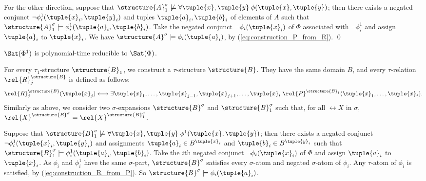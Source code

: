\documentclass{lmcs}
\begin{document}
For the other direction, suppose that $\structure{A}_1^\sigma\not\models\forall\tuple{x},\tuple{y}\;\phi(\tuple{x},\tuple{y})$; then there exists a negated conjunct $\neg\phi_i^1(\tuple{x}_i,\tuple{y}_i)$ and tuples $\tuple{a}_i,\tuple{b}_i$ of elements of $A$ such that $\structure{A}_1^\sigma\models\phi_i^1(\tuple{a}_i,\tuple{b}_i)$.
Take the negated conjunct $\neg\phi_i(\tuple{x}_i)$ of $\Phi$ associated with $\neg\phi_i^1$ and assign $\tuple{a}_i$ to $\tuple{x}_i$.
We have $\structure{A}^\sigma\models\phi_i (\tuple{a}_i)$, by (\ref{eq:construction_P_from_R}).
\qed




\begin{lem}\label{lemma:one_symbol2} 
$\Sat(\Phi^1)$ is polynomial-time reducible to $\Sat(\Phi)$.
\end{lem}
\proof
For every $\tau_1$-structure $\structure{B}_1$, we construct a $\tau$-structure $\structure{B}$.
They have the same domain $B$, and every $\tau$-relation $\rel{R}_j^\structure{B}$ is defined as follows:
\begin{equation}\label{eq:construction_R_from_P}
\rel{R}_j^\structure{B}(\tuple{x}_j)\longleftrightarrow\exists\tuple{x}_1,\ldots,\tuple{x}_{j-1},\tuple{x}_{j+1},\ldots,\tuple{x}_t\;\rel{P}^{\structure{B}_1}(\tuple{x}_1,\ldots,\tuple{x}_t).
\end{equation}
Similarly as above, we consider two $\sigma$-expansions $\structure{B}^\sigma$ and $\structure{B}_1^\sigma$ such that, for all $\rel{X}$ in $\sigma$, $\rel{X}^{\structure{B}^\sigma}=\rel{X}^{\structure{B}_1^\sigma}$.

Suppose that $\structure{B}_1^\sigma\not\models\forall\tuple{x},\tuple{y}\;\phi^1(\tuple{x},\tuple{y})$; then there exists a negated conjunct $\neg\phi_i^1(\tuple{x}_i,\tuple{y}_i)$ and assignments $\tuple{a}_i\in B^{\tuple{x}_i}$ and $\tuple{b}_i\in B^{\tuple{y}_i}$ such that $\structure{B}_1^\sigma\models\phi_i^1(\tuple{a}_i,\tuple{b}_i)$.
Take the $i$th negated conjunct $\neg\phi_i(\tuple{x}_i)$ of $\Phi$ and assign $\tuple{a}_i$ to $\tuple{x}_i$.
As $\phi_i$ and $\phi_i^1$ have the same $\sigma$-part, $\structure{B}^\sigma$ satisfies every $\sigma$-atom and negated $\sigma$-atom of $\phi_i$.
Any $\tau$-atom of $\phi_i$ is satisfied, by (\ref{eq:construction_R_from_P}).
So $\structure{B}^\sigma\models\phi_i(\tuple{a}_i)$.
\end{document}
